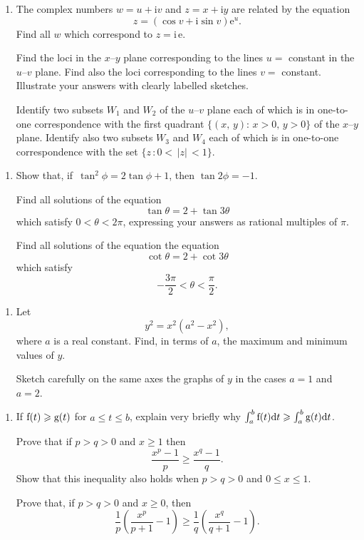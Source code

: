 \documentclass[a4, 11pt]{report}
\newlength{\qspace}
\newcounter{qnumber}
\newenvironment{question}%
 {\vspace{\qspace}
  \begin{enumerate}[\bfseries 1\quad][10]%
    \setcounter{enumi}{\value{qnumber}}%
    \item%
 }
{
  \end{enumerate}
  \filbreak
  \stepcounter{qnumber}
 }
\def\d{{\rm d}}
\def\le{\leqslant}
\def\ge{\geqslant}
\begin{document}
\begin{question}
The complex numbers $w=u+\mathrm{i}v$ and $z=x+\mathrm{i}y$ are related by the
equation
$$z=
(\cos v+\mathrm{i}\sin v)\mathrm{e}^u.$$
Find all $w$ which correspond to $z=\mathrm{i\,e}$.

Find the loci in the $x$--$y$ plane corresponding to the lines $u=$ constant
in the $u$--$v$ plane. Find also the loci corresponding to the lines $v=$
constant. Illustrate your answers with clearly labelled sketches.

Identify two subsets $W_1$ and $W_2$ of the $u$--$v$ plane each of
which is in one-to-one correspondence with the first quadrant
$\{(x,\,y):\,x>0,\,y>0\}$ of the $x$--$y$ plane.
Identify also two subsets $W_3$ and $W_4$ each of which
is in one-to-one correspondence with the set $\{z\,:0<\,\vert z\vert\,<1\}$.

	\end{question}
	
\begin{question}
Show that, if $\,\tan^2\phi=2\tan\phi+1$, then $\tan2\phi=-1$.

Find all solutions of the equation
$$\tan\theta=2+\tan3\theta$$
which satisfy $0<\theta< 2\pi$,
expressing your answers as rational multiples of $\pi$. 

Find all solutions of the equation
the equation
$$\cot\theta=2+\cot3\theta$$
which satisfy $$-\frac{3\pi}{2}<\theta<\frac{\pi}{2}.$$
\end{question}
	
\begin{question}
Let
$$y^2=x^2(a^2-x^2),$$
where $a$ is a real constant.
Find, in terms of $a$, the maximum and minimum values of $y$.


Sketch carefully on the same axes the graphs of $y$
in the cases $a=1$ and $a=2$.
\end{question}
		
\begin{question}	
If   ${\rm f}(t)\ge {\rm g}(t)$ for $a\le t\le b$, explain very
briefly why $\int_a^b {\rm f}(t) \d t \ge \int_a^b {\rm g}(t) \d t$.

Prove that if $p>q>0$ and $x\ge1$ then
$$\frac{x^p-1}{ p}\ge\frac{x^q-1}{ q}.$$
Show that this inequality also holds when $p>q>0$ and $0\le x\le1$.

Prove that, if $p>q>0$ and $x\ge0$, then
$$\frac{1}{ p}\left(\frac{x^p}{ p+1}-1\right)\ge
\frac{1}{q}\left(\frac{x^q}{ q+1}-1\right).$$
\end{question}	
		
\end{document}
